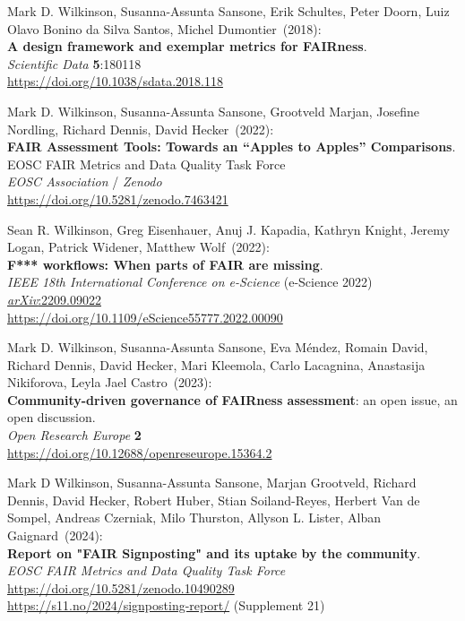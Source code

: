 \begin{thebibliography}{9}
Mark D. Wilkinson, Susanna-Assunta Sansone, Erik Schultes, Peter Doorn, Luiz Olavo Bonino da Silva Santos, Michel Dumontier~(2018): \\
\textbf{A design framework and exemplar metrics for FAIRness}.\\
\emph{Scientific Data} \textbf{5}:180118 \\
\url{https://doi.org/10.1038/sdata.2018.118}

Mark D. Wilkinson, Susanna-Assunta Sansone, Grootveld Marjan, Josefine Nordling, Richard Dennis, David Hecker~(2022): \\
\textbf{FAIR Assessment Tools: Towards an “Apples to Apples” Comparisons}.\\ 
EOSC FAIR Metrics and Data Quality Task Force\\
\emph{EOSC Association} / \emph{Zenodo}\\
\url{https://doi.org/10.5281/zenodo.7463421}

Sean R. Wilkinson, Greg Eisenhauer, Anuj J. Kapadia, Kathryn Knight, Jeremy Logan, Patrick Widener, Matthew Wolf~(2022): \\
\textbf{F*** workflows: When parts of {FAIR} are missing}. \\
\emph{IEEE 18th International Conference on e-Science} (e-Science 2022) \\
\href{https://doi.org/10.48550/arXiv.2209.09022}{\emph{arXiv}:2209.09022} \\
\url{https://doi.org/10.1109/eScience55777.2022.00090}

Mark D. Wilkinson, Susanna-Assunta Sansone, Eva Méndez, Romain David, Richard Dennis, David Hecker, Mari Kleemola, Carlo Lacagnina, Anastasija Nikiforova, Leyla Jael Castro~(2023): \\
\textbf{Community-driven governance of FAIRness assessment}: an open issue, an open discussion.\\
\emph{Open Research Europe} \textbf{2}\\
\url{https://doi.org/10.12688/openreseurope.15364.2}

Mark D Wilkinson, Susanna-Assunta Sansone, Marjan Grootveld, Richard Dennis, David Hecker, Robert Huber, Stian Soiland-Reyes, Herbert Van de Sompel, Andreas Czerniak, Milo Thurston, Allyson L. Lister, Alban Gaignard~(2024):\\  
\textbf{Report on "FAIR Signposting" and its uptake by the community}.\\
\emph{EOSC FAIR Metrics and Data Quality Task Force} \\
\url{https://doi.org/10.5281/zenodo.10490289} \\
\url{https://s11.no/2024/signposting-report/} (Supplement 21)


\end{thebibliography}
